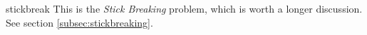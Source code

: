 \begin{answer}{stickbreak}
  This is the \emph{Stick Breaking} problem, which is worth a longer discussion.
  See section \ref{subsec:stickbreaking}.
\end{answer}

